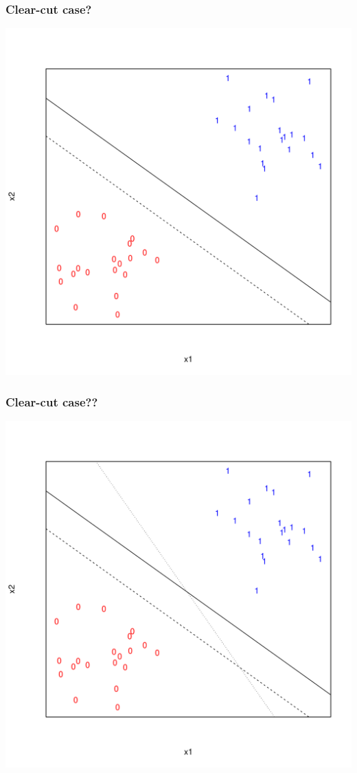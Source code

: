 \documentclass[xcolor=x11names,compress]{beamer}\usepackage[]{graphicx}\usepackage[]{color}
\newenvironment{knitrout}{}{} %
\begin{document}
\begin{frame}
  \frametitle{Clear-cut case?}
\begin{knitrout}\tiny
{}\color{fgcolor}

{\centering \includegraphics[width=.6\linewidth]{figure/beamer-predmod3-1} 

}



\end{knitrout}
\end{frame}

\begin{frame}
  \frametitle{Clear-cut case??}
\begin{knitrout}\tiny
{}\color{fgcolor}

{\centering \includegraphics[width=.6\linewidth]{figure/beamer-predmod3a-1} 

}



\end{knitrout}
\end{frame}
\end{document}

